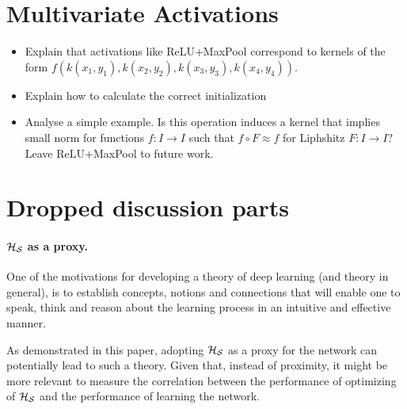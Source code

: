 \section{Multivariate Activations}
\begin{itemize}
\item Explain that activations like ReLU+MaxPool correspond to kernels of the form $f(k(x_1,y_1),k(x_2,y_2),k(x_3,y_3),k(x_4,y_4))$.
\item Explain how to calculate the correct initialization
\item Analyse a simple example. Is this operation induces a kernel that implies small norm for functions $f:I\to I$ such that $f\circ F\approx f$ for Liphshitz $F:I\to I$?
Leave ReLU+MaxPool to future work.
\end{itemize}

\section{Dropped discussion parts}

\paragraph{${\cal H}_{\cal S}$ as a proxy.} One of the motivations for developing a theory of deep learning (and theory in general), is to establish concepts, notions and connections that will enable one to speak, think and reason about the learning process in an intuitive and effective manner.

As demonstrated in this paper, adopting ${\cal H}_{\cal S}$ as a proxy for the network can potentially lead to  such a theory.
Given that, instead of proximity, it might be more relevant to measure the correlation between the performance of optimizing of ${\cal H}_{\cal S}$ and the performance of learning the network.

